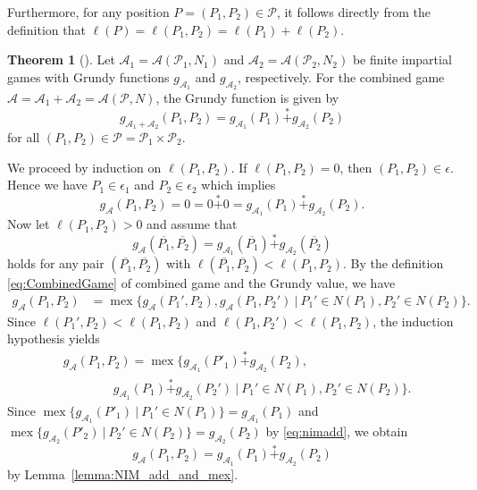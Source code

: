 \documentclass[a4paper,11pt]{amsart}
\theoremstyle{definition}
\newtheorem{thm}{Theorem}[section]
\newenvironment{demo}[1]{%
  \trivlist
  \item[\hskip\labelsep
        {\bf #1.}]
}{%
\hfill\qedsymbol
  \endtrivlist
}
\newcommand{\mex}{\operatorname{mex}}
\newcommand{\nimadd}{\overset{*}{+}}
\numberwithin{equation}{section}
\def\P{\mathcal{P}}
\def\Game{\mathscr{A}}
\def\len#1{\ell\left({#1}\right)}
\begin{document}
%
Furthermore, for any position $P=(P_1,P_2)\in \P$,
it follows directly from the definition that $\len{P}=\len{P_1,P_2}=\len{P_1}+\len{P_2}$.
%
%
%
\begin{thm}[\cite{Lenstra}]\label{gamewathm}
Let $\Game_1=\Game(\P_1,N_1)$ and $\Game_2=\Game(\P_2,N_2)$ be finite impartial games
with Grundy functions $g_{\Game_1}$ and $g_{\Game_2}$, respectively.
For the combined game $\Game=\Game_1+\Game_2=\Game(\P,N)$,
the Grundy function is given by
\begin{equation}
	g_{\Game_1+\Game_2}(P_1,P_2)=g_{\Game_1}(P_1)\nimadd g_{\Game_2}(P_2)
\end{equation}
for all $(P_1,P_2)\in \P=\P_1\times\P_2$.
\end{thm}
%
\begin{demo}{Proof}
We proceed by induction on $\len{P_1,P_2}$.
If $\len{P_1,P_2}=0$, then $(P_1,P_2)\in\epsilon$.
Hence we have $P_1\in \epsilon_1$ and $P_2\in \epsilon_2$ which implies
\[
	g_{\Game}(P_1,P_2)=0=0\nimadd 0=g_{\Game_1}(P_1)\nimadd g_{\Game_2}(P_2).
\]
%
Now let $\len{P_1,P_2}>0$ and assume that  
\[
	g_{\Game}(\overline{P_1},\overline{P_2})=g_{\Game_1}(\overline{P_1})\nimadd g_{\Game_2}(\overline{P_2})
\]
holds for any pair $(\overline{P_1},\overline{P_2})$ with $\len{\overline{P_1},\overline{P_2}}<\len{P_1,P_2}$.
%
By the definition \eqref{eq:CombinedGame} of combined game and the Grundy value, we have
\begin{align*}
g_{\Game}(P_1,P_2)%
			&=\mex\{g_{\Game}(P_1',P_2),g_{\Game}(P_1,P_2')\ |\ P_1'\in N(P_1),P_2'\in N(P_2)\}.
\end{align*}
Since $\len{P_1',P_2}<\len{P_1,P_2}$ and $\len{P_1,P_2'}<\len{P_1,P_2}$,
the induction hypothesis yields
\begin{align*}
	&g_{\Game}(P_1,P_2)=\mex\{g_{\Game_1}(P'_1)\nimadd g_{\Game_2}(P_2),
	\\&\qquad\qquad g_{\Game_1}(P_1)\nimadd g_{\Game_2}(P_2')\ |\ P_1'\in N(P_1),P_2'\in N(P_2)\}.
\end{align*}
Since
$\mex\{g_{\Game_1}(P'_1)\ |\ P_1'\in N(P_1)\}=g_{\Game_1}(P_1)$ and 
$\mex\{g_{\Game_2}(P'_2)\ |\ P_2'\in N(P_2)\}=g_{\Game_2}(P_2)$
by \eqref{eq:nimadd},
we obtain
\[
	g_{\Game}(P_1,P_2)=g_{\Game_1}(P_1)\nimadd g_{\Game_2}(P_2)
\]
by Lemma~\ref{lemma:NIM_add_and_mex}.
\end{demo}
%
%
%
\end{document}
